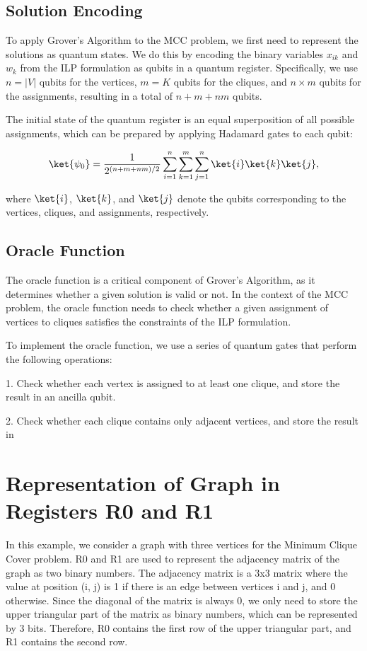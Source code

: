 \subsection{Solution Encoding}

To apply Grover's Algorithm to the MCC problem, we first need to represent the solutions as quantum states. We do this by encoding the binary variables $x_{ik}$ and $w_k$ from the ILP formulation as qubits in a quantum register. Specifically, we use $n = |V|$ qubits for the vertices, $m = K$ qubits for the cliques, and $n \times m$ qubits for the assignments, resulting in a total of $n + m + nm$ qubits.

The initial state of the quantum register is an equal superposition of all possible assignments, which can be prepared by applying Hadamard gates to each qubit:

\begin{equation}
\ket{\psi_0} = \frac{1}{2^{(n+m+nm)/2}} \sum_{i=1}^{n} \sum_{k=1}^{m} \sum_{j=1}^{n} \ket{i}\ket{k}\ket{j},
\end{equation}

where $\ket{i}$, $\ket{k}$, and $\ket{j}$ denote the qubits corresponding to the vertices, cliques, and assignments, respectively.

\subsection{Oracle Function}

The oracle function is a critical component of Grover's Algorithm, as it determines whether a given solution is valid or not. In the context of the MCC problem, the oracle function needs to check whether a given assignment of vertices to cliques satisfies the constraints of the ILP formulation.

To implement the oracle function, we use a series of quantum gates that perform the following operations:

1. Check whether each vertex is assigned to at least one clique, and store the result in an ancilla qubit.

2. Check whether each clique contains only adjacent vertices, and store the result in

\section{Representation of Graph in Registers R0 and R1}

In this example, we consider a graph with three vertices for the Minimum Clique Cover problem. R0 and R1 are used to represent the adjacency matrix of the graph as two binary numbers. The adjacency matrix is a 3x3 matrix where the value at position (i, j) is 1 if there is an edge between vertices i and j, and 0 otherwise. Since the diagonal of the matrix is always 0, we only need to store the upper triangular part of the matrix as binary numbers, which can be represented by 3 bits. Therefore, R0 contains the first row of the upper triangular part, and R1 contains the second row.

